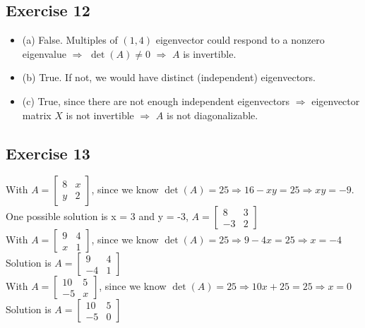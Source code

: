 \documentclass{article}
\begin{document}
\subsection{Exercise 12}
\begin{itemize}
    \item (a) False. Multiples of $(1,4)$ eigenvector could respond to a nonzero eigenvalue $\Rightarrow$ $\det(A) \neq 0$ $\Rightarrow$ $A$ is invertible.
    \item (b) True. If not, we would have distinct (independent) eigenvectors.
    \item (c) True, since there are not enough independent eigenvectors $\Rightarrow$ eigenvector matrix $X$ is not invertible $\Rightarrow$ $A$ is not diagonalizable.
\end{itemize}

\subsection{Exercise 13}
With $A =
    \begin{bmatrix}
        8 & x \\
        y & 2
    \end{bmatrix}$, since we know $\det(A) = 25 \Rightarrow 16 - xy = 25 \Rightarrow xy = -9$.
One possible solution is x = 3 and y = -3,
$A = \begin{bmatrix}
        8 & 3 \\
        -3 & 2
    \end{bmatrix}$
\\
With $A =
    \begin{bmatrix}
        9 & 4 \\
        x & 1
    \end{bmatrix}$, since we know $\det(A) = 25 \Rightarrow 9 - 4x = 25 \Rightarrow x = -4$
Solution is
$A = \begin{bmatrix}
        9 & 4   \\
        -4 & 1
    \end{bmatrix}$
\\
With $A =
    \begin{bmatrix}
        10 & 5 \\
        -5 & x
    \end{bmatrix}$, since we know $\det(A) = 25 \Rightarrow 10x + 25 = 25 \Rightarrow x = 0$
Solution is
$A = \begin{bmatrix}
        10 & 5   \\
        -5 & 0
    \end{bmatrix}$
\end{document}
